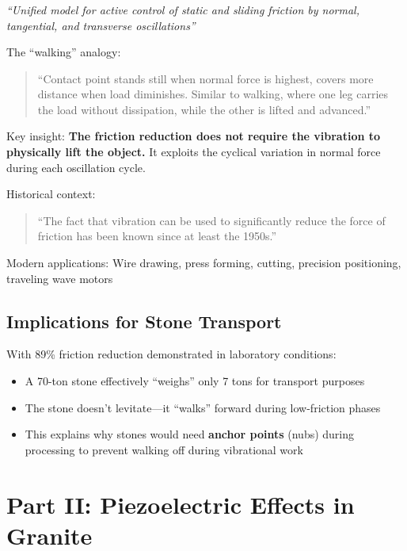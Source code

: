 \documentclass[11pt]{article}
\begin{document}
\subsubsection{\citet{Popov2020}}
\textit{``Unified model for active control of static and sliding friction by normal, tangential, and transverse oscillations''}

The ``walking'' analogy:

\begin{quote}
``Contact point stands still when normal force is highest, covers more distance when load diminishes. Similar to walking, where one leg carries the load without dissipation, while the other is lifted and advanced.''
\end{quote}

Key insight: \textbf{The friction reduction does not require the vibration to physically lift the object.} It exploits the cyclical variation in normal force during each oscillation cycle.

Historical context:
\begin{quote}
``The fact that vibration can be used to significantly reduce the force of friction has been known since at least the 1950s.''
\end{quote}

Modern applications: Wire drawing, press forming, cutting, precision positioning, traveling wave motors

\subsection{Implications for Stone Transport}

With 89\% friction reduction demonstrated in laboratory conditions:

\begin{itemize}
    \item A 70-ton stone effectively ``weighs'' only 7 tons for transport purposes
    \item The stone doesn't levitate---it ``walks'' forward during low-friction phases
    \item This explains why stones would need \textbf{anchor points} (nubs) during processing to prevent walking off during vibrational work
\end{itemize}

\section{Part II: Piezoelectric Effects in Granite}
\end{document}
